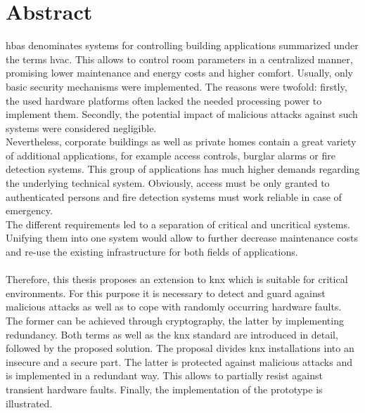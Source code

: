 \chapter*{Abstract}
\gls{hbas} denominates systems for controlling building applications summarized under the terms \gls{hvac}. This allows to control room parameters in a centralized manner, 
promising lower maintenance and energy costs and higher comfort. Usually, only basic security mechanisms were implemented. The reasons were twofold:
firstly, the used hardware platforms often lacked the needed processing power to implement them.
Secondly, the potential impact of malicious attacks against such systems were considered negligible.
\\
Nevertheless, corporate buildings as well as private homes contain a great variety of additional applications, for example access controls, burglar alarms or fire detection systems.
This group of applications has much higher demands regarding the underlying technical system. Obviously, access must be only granted to authenticated persons and fire detection
systems must work reliable in case of emergency. 
\\
The different requirements led to a separation of critical and uncritical systems. Unifying them into one system would allow to further decrease maintenance costs and re-use
the existing infrastructure for both fields of applications.
\\
\\
Therefore, this thesis proposes an extension to \gls{knx} which is suitable for critical environments. For this purpose it is necessary to detect and guard against malicious attacks
as well as to cope with randomly occurring hardware faults. The former can be achieved through cryptography, the latter by implementing redundancy. Both terms as well as the \gls{knx}
standard are introduced in detail, followed by the proposed solution. The proposal divides \gls{knx} installations into an insecure and a secure part. The latter is protected against
malicious attacks and is implemented in a redundant way. This allows to partially resist against transient hardware faults. Finally, the implementation of the prototype is illustrated.